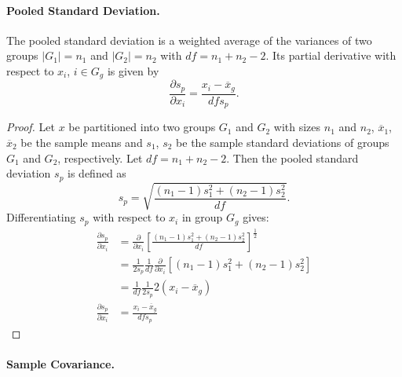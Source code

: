 \paragraph{Pooled Standard Deviation.}

The pooled standard deviation is a weighted average of the variances of two
groups \(|G_1|=n_1\) and \(|G_2|=n_2\) with \(df=n_1+n_2-2\). Its partial
derivative with respect to \(x_i\), \(i \in G_g\) is given by
\begin{equation}
    \frac{\partial s_p}{\partial x_i} = \frac{x_i - \overline{x}_g}{df s_p}.
\end{equation}

\begin{proof}
    Let \(x\) be partitioned into two groups \(G_1\) and \(G_2\) with sizes
    \(n_1\) and \(n_2\), \(\overline{x}_1\), \(\overline{x}_2\) be the sample
    means and \(s_1\), \(s_2\) be the sample standard deviations of groups
    \(G_1\) and \(G_2\), respectively. Let \(df=n_1+n_2-2\). Then the pooled
    standard deviation \(s_p\) is defined as
    \[
        s_p = \sqrt{\frac{(n_1 - 1)s_1^2 + (n_2 - 1)s_2^2}{df}}.
    \]
    Differentiating \(s_p\) with respect to \(x_i\) in group \(G_g\) gives:
    \begin{align*}
        \frac{\partial s_p}{\partial x_i} & = \frac{\partial}{\partial x_i} {\left[\frac{(n_1 - 1)s_1^2 + (n_2 - 1)s_2^2}{df}\right]}^{\frac{1}{2}}   \\
                                          & = \frac{1}{2 s_p} \frac{1}{df} \frac{\partial}{\partial x_i} \left[(n_1 - 1)s_1^2 + (n_2 - 1)s_2^2\right] \\
                                          & = \frac{1}{df}\frac{1}{2 s_p}2(x_i - \overline{x}_g)                                                      \\
        \frac{\partial s_p}{\partial x_i} & = \frac{x_i - \overline{x}_g}{df s_p}
    \end{align*}
\end{proof}

\paragraph{Sample Covariance.}

